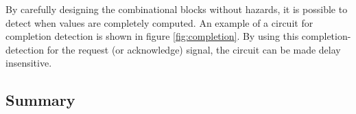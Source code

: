 By carefully designing the combinational blocks without hazards, it is
possible to detect when values are completely computed. An example of
a circuit for completion detection is shown in figure
\ref{fig:completion}. By using this completion-detection for the
request (or acknowledge) signal, the circuit can be made delay
insensitive.

\subsection{Summary}



